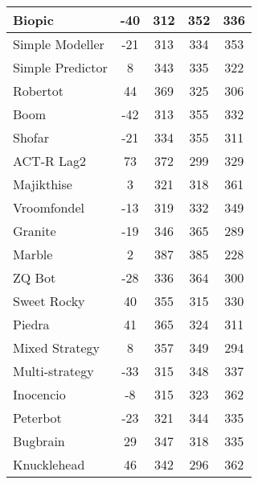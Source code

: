\begin{table}
\begin{tabular}{|l|c|c|c|c|}
Biopic & -40 & 312 & 352 & 336 \\ \hline 
Simple Modeller & -21 & 313 & 334 & 353 \\ \hline 
Simple Predictor & 8 & 343 & 335 & 322 \\ \hline 
Robertot & 44 & 369 & 325 & 306 \\ \hline 
Boom & -42 & 313 & 355 & 332 \\ \hline 
Shofar & -21 & 334 & 355 & 311 \\ \hline 
\rowcolor{HighlightRowColor} ACT-R Lag2 & 73 & 372 & 299 & 329 \\ \hline 
Majikthise & 3 & 321 & 318 & 361 \\ \hline 
Vroomfondel & -13 & 319 & 332 & 349 \\ \hline 
Granite & -19 & 346 & 365 & 289 \\ \hline 
Marble & 2 & 387 & 385 & 228 \\ \hline 
ZQ Bot & -28 & 336 & 364 & 300 \\ \hline 
Sweet Rocky & 40 & 355 & 315 & 330 \\ \hline 
Piedra & 41 & 365 & 324 & 311 \\ \hline 
Mixed Strategy & 8 & 357 & 349 & 294 \\ \hline 
Multi-strategy & -33 & 315 & 348 & 337 \\ \hline 
Inocencio & -8 & 315 & 323 & 362 \\ \hline 
Peterbot & -23 & 321 & 344 & 335 \\ \hline 
Bugbrain & 29 & 347 & 318 & 335 \\ \hline 
Knucklehead & 46 & 342 & 296 & 362 \\ \hline
        \end{tabular}
    \end{table}